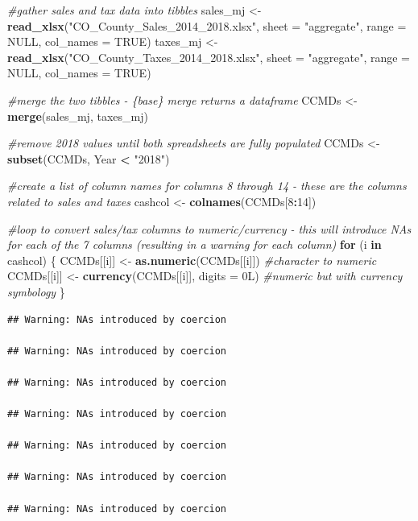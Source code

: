 \documentclass[]{article}
\newenvironment{Shaded}{\begin{snugshade}}{\end{snugshade}}
\newcommand{\CommentTok}[1]{\textcolor[rgb]{0.56,0.35,0.01}{\textit{#1}}}
\newcommand{\ControlFlowTok}[1]{\textcolor[rgb]{0.13,0.29,0.53}{\textbf{#1}}}
\newcommand{\DataTypeTok}[1]{\textcolor[rgb]{0.13,0.29,0.53}{#1}}
\newcommand{\DecValTok}[1]{\textcolor[rgb]{0.00,0.00,0.81}{#1}}
\newcommand{\KeywordTok}[1]{\textcolor[rgb]{0.13,0.29,0.53}{\textbf{#1}}}
\newcommand{\NormalTok}[1]{#1}
\newcommand{\OperatorTok}[1]{\textcolor[rgb]{0.81,0.36,0.00}{\textbf{#1}}}
\newcommand{\OtherTok}[1]{\textcolor[rgb]{0.56,0.35,0.01}{#1}}
\newcommand{\StringTok}[1]{\textcolor[rgb]{0.31,0.60,0.02}{#1}}
\begin{document}
\begin{Shaded}
\begin{Highlighting}[]
\CommentTok{#gather sales and tax data into tibbles}
\NormalTok{sales_mj <-}\StringTok{ }\KeywordTok{read_xlsx}\NormalTok{(}\StringTok{"CO_County_Sales_2014_2018.xlsx"}\NormalTok{, }\DataTypeTok{sheet =} \StringTok{"aggregate"}\NormalTok{, }\DataTypeTok{range =} \OtherTok{NULL}\NormalTok{, }\DataTypeTok{col_names =} \OtherTok{TRUE}\NormalTok{)}
\NormalTok{taxes_mj <-}\StringTok{ }\KeywordTok{read_xlsx}\NormalTok{(}\StringTok{"CO_County_Taxes_2014_2018.xlsx"}\NormalTok{, }\DataTypeTok{sheet =} \StringTok{"aggregate"}\NormalTok{, }\DataTypeTok{range =} \OtherTok{NULL}\NormalTok{, }\DataTypeTok{col_names =} \OtherTok{TRUE}\NormalTok{)}

\CommentTok{#merge the two tibbles - \{base\} merge returns a dataframe}
\NormalTok{CCMDs <-}\StringTok{ }\KeywordTok{merge}\NormalTok{(sales_mj, taxes_mj)}

\CommentTok{#remove 2018 values until both spreadsheets are fully populated}
\NormalTok{CCMDs <-}\StringTok{ }\KeywordTok{subset}\NormalTok{(CCMDs, Year }\OperatorTok{<}\StringTok{ "2018"}\NormalTok{)}

\CommentTok{#create a list of column names for columns 8 through 14 - these are the columns related to sales and taxes}
\NormalTok{cashcol <-}\StringTok{ }\KeywordTok{colnames}\NormalTok{(CCMDs[}\DecValTok{8}\OperatorTok{:}\DecValTok{14}\NormalTok{])}

\CommentTok{#loop to convert sales/tax columns to numeric/currency - this will introduce NAs for each of the 7 columns (resulting in a warning for each column)}
\ControlFlowTok{for}\NormalTok{ (i }\ControlFlowTok{in}\NormalTok{ cashcol) \{}
\NormalTok{  CCMDs[[i]] <-}\StringTok{ }\KeywordTok{as.numeric}\NormalTok{(CCMDs[[i]])   }\CommentTok{#character to numeric}
\NormalTok{  CCMDs[[i]] <-}\StringTok{ }\KeywordTok{currency}\NormalTok{(CCMDs[[i]], }\DataTypeTok{digits =}\NormalTok{ 0L) }\CommentTok{#numeric but with currency symbology}
\NormalTok{\}}
\end{Highlighting}
\end{Shaded}

\begin{verbatim}
## Warning: NAs introduced by coercion

## Warning: NAs introduced by coercion

## Warning: NAs introduced by coercion

## Warning: NAs introduced by coercion

## Warning: NAs introduced by coercion

## Warning: NAs introduced by coercion

## Warning: NAs introduced by coercion
\end{verbatim}
\end{document}
